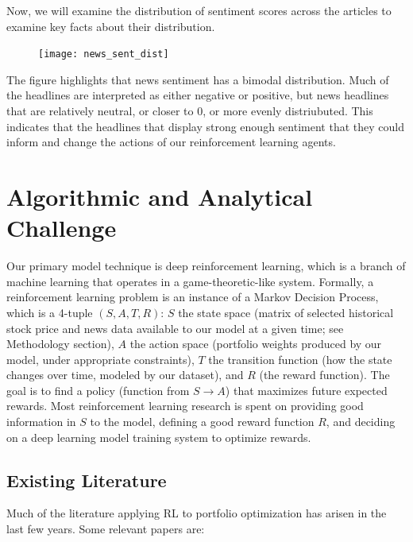 Now, we will examine the distribution of sentiment scores across the articles to examine key facts about their distribution.

\begin{figure}
\texttt{[image: news\_sent\_dist]}
\end{figure}

The figure highlights that news sentiment has a bimodal distribution. Much of the headlines are interpreted as either negative or positive, but news headlines that are relatively neutral, or closer to 0, or more evenly distriubuted. 
This indicates that the headlines that display strong enough sentiment that they could inform and change the actions of our reinforcement learning agents.



\section{Algorithmic and Analytical Challenge}

Our primary model technique is deep reinforcement learning, which is a 
branch of machine learning that operates in a game-theoretic-like system. 
Formally, a reinforcement learning problem is an instance of a Markov 
Decision Process, which is a 4-tuple $(S, A, T, R)$: $S$ the state space 
(matrix of selected historical stock price and news data available to 
our model at a given time; see Methodology section), $A$ the action space 
(portfolio weights produced by our model, under appropriate constraints), 
$T$ the transition function (how the state changes over time, modeled by our dataset), 
and $R$ (the reward function). The goal is to find a policy (function from $S \to A$) 
that maximizes future expected rewards. Most reinforcement learning research is 
spent on providing good information in $S$ to the model, defining a good reward 
function $R$, and deciding on a deep learning model training system to optimize rewards.

\subsection{Existing Literature}

Much of the literature applying RL to portfolio optimization has arisen in the 
last few years. Some relevant papers are:

